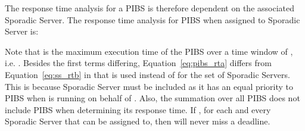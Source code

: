 The response time analysis for a PIBS is therefore dependent on the associated
Sporadic Server.  The response time analysis for PIBS  when assigned to
Sporadic Server  is:

Note that  is the maximum execution time of the PIBS
over a time window of , i.e.  .  Besides the first terms differing,
Equation~\ref{eq:pibs_rta} differs from Equation~\ref{eq:ss_rtb} in that
 is used instead of 
for the set of Sporadic Servers.  This is because Sporadic Server 
must be included as it has an equal priority to PIBS  when  is
running on behalf of .  Also, the summation over all PIBS does not
include PIBS  when determining its response time.  If
, for each and every Sporadic Server  that 
can be assigned to, then  will never miss a deadline.













